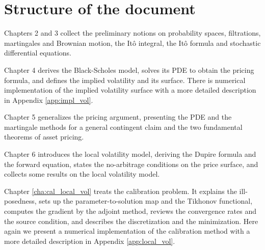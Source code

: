 \section{Structure of the document}

Chapters 2 and 3 collect the preliminary notions on probability spaces,
filtrations, martingales and Brownian motion,
the It\^{o} integral, the It\^{o} formula and stochastic differential equations.

Chapter 4 derives the Black-Scholes model,
solves its PDE to obtain the pricing formula,
and defines the implied volatility and its surface.
There is numerical implementation of the implied volatility surface with a more detailed description in Appendix \ref{app:impl_vol}.

Chapter 5 generalizes the pricing argument,
presenting the PDE and the martingale methods for a general contingent claim and the two fundamental theorems of asset pricing.

Chapter 6 introduces the local volatility model,
deriving the Dupire formula and the forward equation,
states the no-arbitrage conditions on the price surface,
and collects some results on the local volatility model.

Chapter \ref{cha:cal_local_vol} treats the calibration problem.
It explains the ill-posedness,
sets up the parameter-to-solution map and the Tikhonov functional,
computes the gradient by the adjoint method,
reviews the convergence rates and the source condition,
and describes the discretization and the minimization.
Here again we present a numerical implementation of the calibration method with a more detailed description in Appendix \ref{app:local_vol}.
